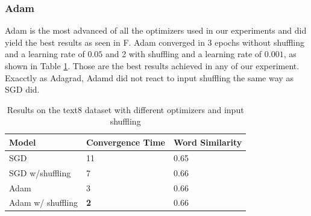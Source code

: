 \subsubsection{Adam}
Adam is the most advanced of all the optimizers used in our experiments and did yield the best results as seen in F. Adam converged in 3 epochs without shuffling and a learning rate of $0.05$ and 2 with shuffling and a learning rate of $0.001$, as shown in Table \ref{table:results}. Those are the best results achieved in any of our experiment. Exacctly as Adagrad, Adamd did not react to input shuffling the same way as SGD did.
    \begin{table}[]
\begin{tabular}{|l|l|l|}
\hline
Model    & Convergence Time & Word Similarity \\ \hline
SGD & {11}              & 0.65            \\ \hline
SGD w/shuffling & {7}              & 0.66            \\ \hline
Adam & {3}              & 0.66            \\ \hline
Adam w/ shuffling & \textbf{2}              & 0.66      \\ \hline
\end{tabular}
\label{table:results}
\caption{Results on the text8 dataset with different optimizers and input shuffling}

\end{table}

